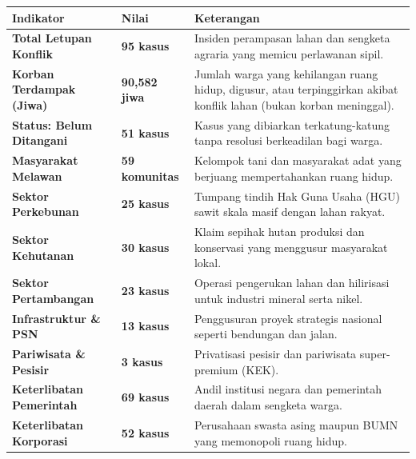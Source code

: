 \documentclass[
]{article}
\newcounter{none} %
\begin{document}
{\def\LTcaptype{none} %
\begin{longtable}[]{@{}
  >{\raggedright\arraybackslash}p{}
  >{\raggedright\arraybackslash}p{}
  >{\raggedright\arraybackslash}p{}@{}}
\toprule\noalign{}
\begin{minipage}[b]{\linewidth}\raggedright
Indikator
\end{minipage} & \begin{minipage}[b]{\linewidth}\raggedright
Nilai
\end{minipage} & \begin{minipage}[b]{\linewidth}\raggedright
Keterangan
\end{minipage} \\
\midrule\noalign{}
\endhead
\bottomrule\noalign{}
\endlastfoot
\textbf{Total Letupan Konflik} & \textbf{95 kasus} & Insiden perampasan
lahan dan sengketa agraria yang memicu perlawanan sipil. \\
\textbf{Korban Terdampak (Jiwa)} & \textbf{90,582 jiwa} & Jumlah warga
yang kehilangan ruang hidup, digusur, atau terpinggirkan akibat konflik
lahan (bukan korban meninggal). \\
\textbf{Status: Belum Ditangani} & \textbf{51 kasus} & Kasus yang
dibiarkan terkatung-katung tanpa resolusi berkeadilan bagi warga. \\
\textbf{Masyarakat Melawan} & \textbf{59 komunitas} & Kelompok tani dan
masyarakat adat yang berjuang mempertahankan ruang hidup. \\
\textbf{Sektor Perkebunan} & \textbf{25 kasus} & Tumpang tindih Hak Guna
Usaha (HGU) sawit skala masif dengan lahan rakyat. \\
\textbf{Sektor Kehutanan} & \textbf{30 kasus} & Klaim sepihak hutan
produksi dan konservasi yang menggusur masyarakat lokal. \\
\textbf{Sektor Pertambangan} & \textbf{23 kasus} & Operasi pengerukan
lahan dan hilirisasi untuk industri mineral serta nikel. \\
\textbf{Infrastruktur \& PSN} & \textbf{13 kasus} & Penggusuran proyek
strategis nasional seperti bendungan dan jalan. \\
\textbf{Pariwisata \& Pesisir} & \textbf{3 kasus} & Privatisasi pesisir
dan pariwisata super-premium (KEK). \\
\textbf{Keterlibatan Pemerintah} & \textbf{69 kasus} & Andil institusi
negara dan pemerintah daerah dalam sengketa warga. \\
\textbf{Keterlibatan Korporasi} & \textbf{52 kasus} & Perusahaan swasta
asing maupun BUMN yang memonopoli ruang hidup. \\
\end{longtable}
}
\end{document}

